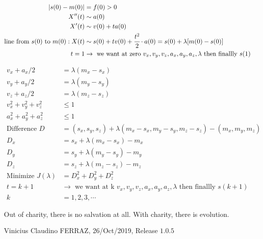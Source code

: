 \documentclass[11pt]{article}
\begin{document}
\begin{align}
 |s(0) - m(0)| &= f(0) > 0 \\
 X''(t) &\sim a(0) \\
 X'(t) &\sim v(0) + t a(0) \\
 \text{line from }s(0)\text{ to }m(0): X(t) &\sim s(0) + t v(0) + \cfrac{t^2}{2}\cdot a(0) = s(0) + \lambda[ m(0) - s(0) ] \\
 t = 1 &\to \text{ we want at zero } v_x, v_y, v_z, a_x, a_y, a_z, \lambda \text{ then finallly }s(1)
\end{align}

\begin{align}
 v_x + a_x/2 &= \lambda (m_x - s_x) \\
 v_y + a_y/2 &= \lambda (m_y - s_y) \\
 v_z + a_z/2 &= \lambda (m_z - s_z) \\
v_x^2 + v_y^2 + v_z^2 &\le 1 \\
 a_x^2 + a_y^2 + a_z^2 &\le 1 \\
 \text{Difference } D &= (s_x, s_y, s_z) + \lambda(m_x - s_x, m_y - s_y, m_z - s_z) - (m_x, m_y, m_z) \\
 D_x &= s_x + \lambda(m_x - s_x) - m_x \\
 D_y &= s_y + \lambda(m_y - s_y) - m_y \\
 D_z &= s_z + \lambda(m_z - s_z) - m_z \\
\text{Minimize }J(\lambda) &= D_x^2 + D_y^2 + D_z^2 \\
 t = k+1 &\to \text{ we want at k } v_x, v_y, v_z, a_x, a_y, a_z, \lambda \text{ then finallly }s(k+1) \\
 k &= 1, 2, 3, \cdots
\end{align}

		\vspace{3mm}

Out of charity, there is no salvation at all. With charity, there is evolution.

\vspace{3mm}

Vinicius Claudino FERRAZ, 26/Oct/2019, Release $1.0.5$
\end{document}
